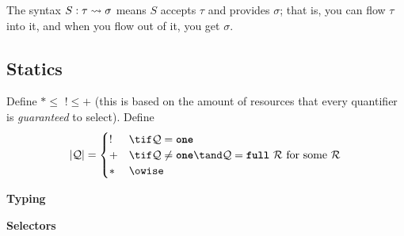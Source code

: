 \documentclass[10pt]{article}
\begin{document}
The syntax $S : \tau \flowsto \sigma$ means $S$ accepts $\tau$ and provides $\sigma$; that is, you can flow $\tau$ into it, and when you flow out of it, you get $\sigma$.

\subsection{Statics}
Define $* \leq \,\, ! \leq +$ (this is based on the amount of resources that every quantifier is \emph{guaranteed} to select).
Define
\begin{align*}
    |\mathcal{Q}| =
    \begin{cases}
        ! & \tif \mathcal{Q} = \one \\
        + & \tif \mathcal{Q} \neq \one \tand \mathcal{Q} = \fullq~\mathcal{R}~\text{for some}~\mathcal{R} \\
        * & \owise
    \end{cases}
\end{align*}


 \textbf{Typing}
\begin{mathpar}




\end{mathpar}


 \textbf{Selectors}
\begin{mathpar}


\end{mathpar}
\end{document}
